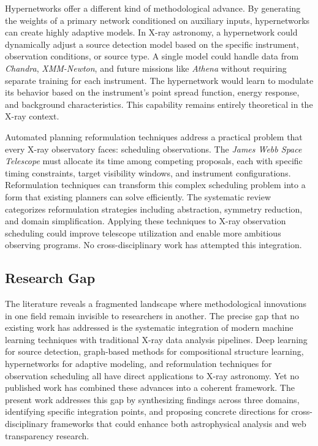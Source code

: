 \documentclass[conference]{IEEEtran}
\begin{document}
Hypernetworks \cite{r7} offer a different kind of methodological advance. By generating the weights of a primary network conditioned on auxiliary inputs, hypernetworks can create highly adaptive models. In X-ray astronomy, a hypernetwork could dynamically adjust a source detection model based on the specific instrument, observation conditions, or source type. A single model could handle data from \textit{Chandra}, \textit{XMM-Newton}, and future missions like \textit{Athena} without requiring separate training for each instrument. The hypernetwork would learn to modulate its behavior based on the instrument's point spread function, energy response, and background characteristics. This capability remains entirely theoretical in the X-ray context.

Automated planning reformulation techniques \cite{r8} address a practical problem that every X-ray observatory faces: scheduling observations. The \textit{James Webb Space Telescope} must allocate its time among competing proposals, each with specific timing constraints, target visibility windows, and instrument configurations. Reformulation techniques can transform this complex scheduling problem into a form that existing planners can solve efficiently. The systematic review \cite{r8} categorizes reformulation strategies including abstraction, symmetry reduction, and domain simplification. Applying these techniques to X-ray observation scheduling could improve telescope utilization and enable more ambitious observing programs. No cross-disciplinary work has attempted this integration.

\subsection{Research Gap}

The literature reveals a fragmented landscape where methodological innovations in one field remain invisible to researchers in another. The precise gap that no existing work has addressed is the systematic integration of modern machine learning techniques with traditional X-ray data analysis pipelines. Deep learning for source detection, graph-based methods for compositional structure learning, hypernetworks for adaptive modeling, and reformulation techniques for observation scheduling all have direct applications to X-ray astronomy. Yet no published work has combined these advances into a coherent framework. The present work addresses this gap by synthesizing findings across three domains, identifying specific integration points, and proposing concrete directions for cross-disciplinary frameworks that could enhance both astrophysical analysis and web transparency research.
\end{document}
